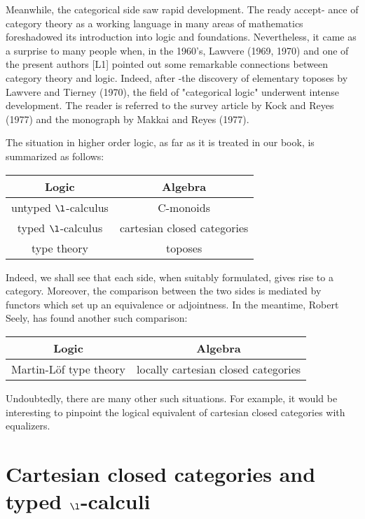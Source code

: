 Meanwhile, the categorical side saw rapid development. The ready accept-
ance of category theory as a working language in many areas of mathematics
foreshadowed its introduction into logic and foundations. Nevertheless, it
came as a surprise to many people when, in the 1960's, Lawvere (1969, 1970) and
one of the present authors [L1] pointed out some remarkable connections between
category theory and logic. Indeed, after -the discovery of elementary toposes
by Lawvere and Tierney (1970), the field of "categorical logic" underwent
intense development. The reader is referred to the survey article by Kock and
Reyes (1977) and the monograph by Makkai and Reyes (1977).

The situation in higher order logic, as far as it is treated in our book,
is summarized as follows:

\medskip
\renewcommand{\arraystretch}{1.5}

\begin{center}
\begin{tabular}{ c | c }
 \hline
Logic & Algebra \\
 \hline
 untyped $\l$-calculus & C-monoids \\
 typed $\l$-calculus & cartesian closed categories \\
 type theory & toposes \\
 \hline
\end{tabular}
\end{center}
\medskip

\noindent
Indeed, we shall see that each side, when suitably formulated, gives rise to a
category. Moreover, the comparison between the two sides is mediated by
functors which set up an equivalence or adjointness. In the meantime, Robert
Seely, has found another such comparison:

\begin{center}
\begin{tabular}{ c | c }
 \hline
Logic & Algebra \\
 \hline
Martin-L\"of type theory  & locally cartesian closed categories \\
 \hline
\end{tabular}
\end{center}
\medskip

\noindent
Undoubtedly, there are many other such situations. For example, it would be
interesting to pinpoint the logical equivalent of cartesian closed categories
with equalizers.

\section{Cartesian closed categories and typed $\l$-calculi}

